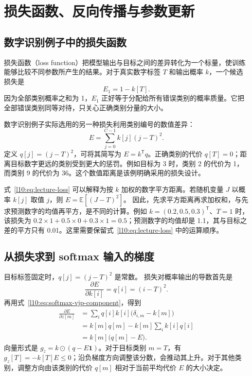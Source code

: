 \section{损失函数、反向传播与参数更新}
\subsection{数字识别例子中的损失函数}

损失函数（loss function）把模型输出与目标之间的差异转化为一个标量，使训练能够比较不同参数所产生的结果。对于真实数字标签 $T$ 和输出概率 $k$，一个候选损失是
\begin{equation}
 E_1=1-k[T].
\end{equation}
因为全部类别概率之和为 1，$E_1$ 正好等于分配给所有错误类别的概率质量。它把全部错误类别同等对待，只关心正确类别分量的大小。

数字识别例子实际选用的另一种损失利用类别编号的数值差异：
\begin{equation}
 \boxed{E=\sum_{j=0}^{C-1}k[j](j-T)^2.}
 \label{l10:eq:lecture-loss}
\end{equation}
定义 $q[j]=(j-T)^2$，可将其简写为 $E=k^{\mathsf T}q$。正确类别的代价 $q[T]=0$；距离目标数字更远的类别受到更大的惩罚。例如目标为 3 时，类别 2 的代价为 1，而类别 9 的代价为 36。这个数值距离是该例明确采用的损失设计。

式~\eqref{l10:eq:lecture-loss} 可以解释为按 $k$ 加权的数字平方距离。若随机变量 $J$ 以概率 $k[j]$ 取值 $j$，则 $E=\mathbb{E}[(J-T)^2]$。
因此，先求平方距离再求加权和，与先求预测数字的均值再平方，是不同的计算。例如 $k=(0.2,0.5,0.3)^{\mathsf T}$、$T=1$ 时，该损失为 $0.2\times1+0.5\times0+0.3\times1=0.5$；预测数字的均值却是 1.1，其与目标之差的平方只有 0.01。这里需要保留式~\eqref{l10:eq:lecture-loss} 中的运算顺序。

\subsection{从损失求到 softmax 输入的梯度}

目标标签固定时，$q[j]=(j-T)^2$ 是常数。
损失对概率输出的导数首先是
\begin{equation}
 \frac{\partial E}{\partial k[i]}=q[i]=(i-T)^2.
 \label{l10:eq:loss-k-gradient}
\end{equation}
再用式~\eqref{l10:eq:softmax-vjp-component}，得到
\begin{align}
 \frac{\partial E}{\partial z[m]}
 &=\sum_i q[i]k[i]\bigl(\delta_{i,m}-k[m]\bigr)\\
 &=k[m]q[m]-k[m]\sum_i k[i]q[i]\\
 &=\boxed{k[m]\bigl(q[m]-E\bigr).}
 \label{l10:eq:loss-z-gradient}
\end{align}
向量形式是 $g_z=k\mathbin{\odot}(q-E\mathbf{1})$。对于目标类别 $m=T$，有 $g_z[T]=-k[T]E\le0$；沿负梯度方向调整该分数，会推动其上升。对于其他类别，调整方向由该类别的代价 $q[m]$ 相对于当前平均代价 $E$ 的大小决定。

